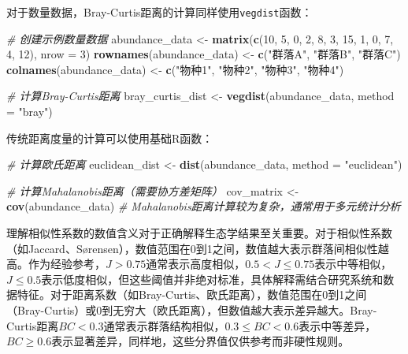 \documentclass[
  twoside,12pt,fontset=none]{ctexbook}
\newenvironment{Shaded}{\begin{snugshade}}{\end{snugshade}}
\newcommand{\AttributeTok}[1]{\textcolor[rgb]{0.13,0.29,0.53}{#1}}
\newcommand{\CommentTok}[1]{\textcolor[rgb]{0.56,0.35,0.01}{\textit{#1}}}
\newcommand{\DecValTok}[1]{\textcolor[rgb]{0.00,0.00,0.81}{#1}}
\newcommand{\FunctionTok}[1]{\textcolor[rgb]{0.13,0.29,0.53}{\textbf{#1}}}
\newcommand{\NormalTok}[1]{#1}
\newcommand{\OtherTok}[1]{\textcolor[rgb]{0.56,0.35,0.01}{#1}}
\newcommand{\StringTok}[1]{\textcolor[rgb]{0.31,0.60,0.02}{#1}}
\begin{document}
对于数量数据，Bray-Curtis距离的计算同样使用\texttt{vegdist}函数：

\begin{Shaded}
\begin{Highlighting}[]
\CommentTok{\# 创建示例数量数据}
\NormalTok{abundance\_data }\OtherTok{\textless{}{-}} \FunctionTok{matrix}\NormalTok{(}\FunctionTok{c}\NormalTok{(}\DecValTok{10}\NormalTok{, }\DecValTok{5}\NormalTok{, }\DecValTok{0}\NormalTok{, }\DecValTok{2}\NormalTok{, }\DecValTok{8}\NormalTok{, }\DecValTok{3}\NormalTok{, }\DecValTok{15}\NormalTok{, }\DecValTok{1}\NormalTok{, }\DecValTok{0}\NormalTok{, }\DecValTok{7}\NormalTok{, }\DecValTok{4}\NormalTok{, }\DecValTok{12}\NormalTok{),}
                         \AttributeTok{nrow =} \DecValTok{3}\NormalTok{)}
\FunctionTok{rownames}\NormalTok{(abundance\_data) }\OtherTok{\textless{}{-}} \FunctionTok{c}\NormalTok{(}\StringTok{"群落A"}\NormalTok{, }\StringTok{"群落B"}\NormalTok{, }\StringTok{"群落C"}\NormalTok{)}
\FunctionTok{colnames}\NormalTok{(abundance\_data) }\OtherTok{\textless{}{-}} \FunctionTok{c}\NormalTok{(}\StringTok{"物种1"}\NormalTok{, }\StringTok{"物种2"}\NormalTok{, }\StringTok{"物种3"}\NormalTok{, }\StringTok{"物种4"}\NormalTok{)}

\CommentTok{\# 计算Bray{-}Curtis距离}
\NormalTok{bray\_curtis\_dist }\OtherTok{\textless{}{-}} \FunctionTok{vegdist}\NormalTok{(abundance\_data, }\AttributeTok{method =} \StringTok{"bray"}\NormalTok{)}
\end{Highlighting}
\end{Shaded}

传统距离度量的计算可以使用基础R函数：

\begin{Shaded}
\begin{Highlighting}[]
\CommentTok{\# 计算欧氏距离}
\NormalTok{euclidean\_dist }\OtherTok{\textless{}{-}} \FunctionTok{dist}\NormalTok{(abundance\_data, }\AttributeTok{method =} \StringTok{"euclidean"}\NormalTok{)}

\CommentTok{\# 计算Mahalanobis距离（需要协方差矩阵）}
\NormalTok{cov\_matrix }\OtherTok{\textless{}{-}} \FunctionTok{cov}\NormalTok{(abundance\_data)}
\CommentTok{\# Mahalanobis距离计算较为复杂，通常用于多元统计分析}
\end{Highlighting}
\end{Shaded}

理解相似性系数的数值含义对于正确解释生态学结果至关重要。对于相似性系数（如Jaccard、Sørensen），数值范围在0到1之间，数值越大表示群落间相似性越高。作为经验参考，\(J > 0.75\)通常表示高度相似，\(0.5 < J \leq 0.75\)表示中等相似，\(J \leq 0.5\)表示低度相似，但这些阈值并非绝对标准，具体解释需结合研究系统和数据特征。对于距离系数（如Bray-Curtis、欧氏距离），数值范围在0到1之间（Bray-Curtis）或0到无穷大（欧氏距离），但数值越大表示差异越大。Bray-Curtis距离\(BC < 0.3\)通常表示群落结构相似，\(0.3 \leq BC < 0.6\)表示中等差异，\(BC \geq 0.6\)表示显著差异，同样地，这些分界值仅供参考而非硬性规则。
\end{document}
